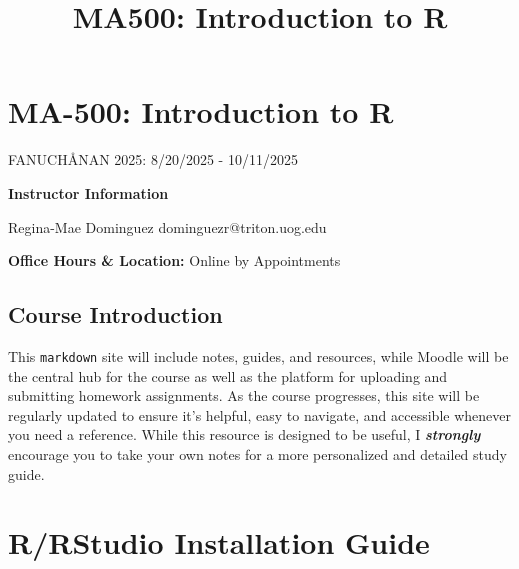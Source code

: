 \documentclass[
  letterpaper,
  DIV=11,
  numbers=noendperiod]{scrreprt}
\title{MA500: Introduction to R}
\author{}
\date{}
\renewcommand*\contentsname{Table of contents}
\newcommand\contentsname{Table of contents}
\begin{document}
\maketitle

\renewcommand*\contentsname{Table of contents}
{
\hypersetup{linkcolor=}
\setcounter{tocdepth}{2}
\tableofcontents
}


\chapter*{MA-500: Introduction to R}\label{ma-500-introduction-to-r}


FANUCHÅNAN 2025: 8/20/2025 - 10/11/2025

\textbf{Instructor Information}

Regina-Mae Dominguez \textbar{} dominguezr@triton.uog.edu

\textbf{Office Hours \& Location:} Online by Appointments

\section*{Course Introduction}\label{course-introduction}


This \texttt{markdown} site will include notes, guides, and resources,
while Moodle will be the central hub for the course as well as the
platform for uploading and submitting homework assignments. As the
course progresses, this site will be regularly updated to ensure it's
helpful, easy to navigate, and accessible whenever you need a reference.
While this resource is designed to be useful, I \textbf{\emph{strongly}}
encourage you to take your own notes for a more personalized and
detailed study guide.


\chapter*{R/RStudio Installation
Guide}\label{rrstudio-installation-guide}

\end{document}
